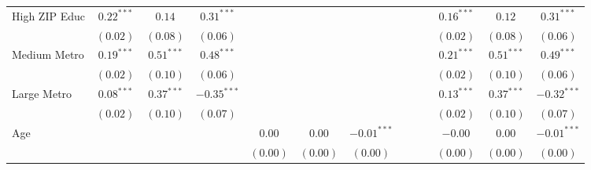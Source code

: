 \documentclass[12pt,twoside]{reedthesis}
\begin{document}
\begin{table}
\begin{center}
\begin{tiny}
\begin{tabular}{l@{} c@{} c@{} c@{} c@{} c@{} c@{} c@{} c@{} c@{} c@{} c@{} c@{} }
  High ZIP Educ      & $\mathbf{0.22}^{***}$ & $0.14$                 & $\mathbf{0.31}^{***}$  &                        &                        &                        &                        &                        &                        & $\mathbf{0.16}^{***}$  & $0.12$                 & $\mathbf{0.31}^{***}$  \\
                     & $(0.02)$              & $(0.08)$               & $(0.06)$               &                        &                        &                        &                        &                        &                        & $(0.02)$               & $(0.08)$               & $(0.06)$               \\
  Medium Metro       & $\mathbf{0.19}^{***}$ & $\mathbf{0.51}^{***}$  & $\mathbf{0.48}^{***}$  &                        &                        &                        &                        &                        &                        & $\mathbf{0.21}^{***}$  & $\mathbf{0.51}^{***}$  & $\mathbf{0.49}^{***}$  \\
                     & $(0.02)$              & $(0.10)$               & $(0.06)$               &                        &                        &                        &                        &                        &                        & $(0.02)$               & $(0.10)$               & $(0.06)$               \\
  Large Metro        & $\mathbf{0.08}^{***}$ & $\mathbf{0.37}^{***}$  & $\mathbf{-0.35}^{***}$ &                        &                        &                        &                        &                        &                        & $\mathbf{0.13}^{***}$  & $\mathbf{0.37}^{***}$  & $\mathbf{-0.32}^{***}$ \\
                     & $(0.02)$              & $(0.10)$               & $(0.07)$               &                        &                        &                        &                        &                        &                        & $(0.02)$               & $(0.10)$               & $(0.07)$               \\
  Age                &                       &                        &                        & $0.00$                 & $0.00$                 & $\mathbf{-0.01}^{***}$ &                        &                        &                        & $-0.00$                & $0.00$                 & $\mathbf{-0.01}^{***}$ \\
                     &                       &                        &                        & $(0.00)$               & $(0.00)$               & $(0.00)$               &                        &                        &                        & $(0.00)$               & $(0.00)$               & $(0.00)$               \\

\end{tabular}
\end{tiny}
\end{center}
\end{table}
\end{document}
